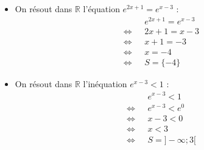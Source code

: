 \documentclass[11pt,a4paper]{article}
\begin{document}
\begin{minipage}{0.5\textwidth}
    \begin{itemize}
        \item On résout dans $\mathbb{R}$ l'équation $e^{2x+1}=e^{x-3}$ :
        \begin{align*}
            &e^{2x+1}=e^{x-3} \\
            \Leftrightarrow\text{ }&2x+1=x-3 \\
            \Leftrightarrow\text{ }&x+1=-3 \\
            \Leftrightarrow\text{ }&x=-4 \\
            \Leftrightarrow\text{ }&S=\{-4\}
        \end{align*}
    \end{itemize}
\end{minipage}
\hfill
\begin{minipage}{0.5\textwidth}
    \begin{itemize}
        \item On résout dans $\mathbb{R}$ l'inéquation $e^{x-3}<1$ :
        \begin{align*}
            &e^{x-3}<1 \\
            \Leftrightarrow\text{ }&e^{x-3}<e^0 \\
            \Leftrightarrow\text{ }&x-3<0 \\
            \Leftrightarrow\text{ }&x<3 \\
            \Leftrightarrow\text{ }&S=]-\infty;3[
        \end{align*}
    \end{itemize}
\end{minipage}
\end{document}
